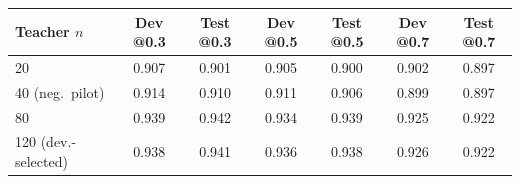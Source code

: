 \begin{tabular}{@{}lcccccc@{}}
\toprule
Teacher $n$ & Dev @0.3 & Test @0.3 & Dev @0.5 & Test @0.5 & Dev @0.7 & Test @0.7 \\
\midrule
20 & 0.907 & 0.901 & 0.905 & 0.900 & 0.902 & 0.897 \\
40 (neg.\ pilot) & 0.914 & 0.910 & 0.911 & 0.906 & 0.899 & 0.897 \\
80 & 0.939 & 0.942 & 0.934 & 0.939 & 0.925 & 0.922 \\
120 (dev.-selected) & 0.938 & 0.941 & 0.936 & 0.938 & 0.926 & 0.922 \\
\bottomrule
\end{tabular}
